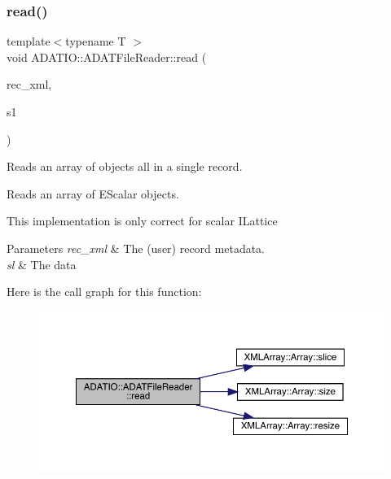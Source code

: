 \subsubsection{\texorpdfstring{read()}{read()}\hspace{0.1cm}{\footnotesize\ttfamily [2/7]}}
{\footnotesize\ttfamily template$<$typename T $>$ \\
void A\+D\+A\+T\+I\+O\+::\+A\+D\+A\+T\+File\+Reader\+::read (\begin{DoxyParamCaption}\item[{\mbox{\hyperlink{classADATXML_1_1XMLReader}{X\+M\+L\+Reader}} \&}]{rec\+\_\+xml,  }\item[{\mbox{\hyperlink{classXMLArray_1_1Array}{Array}}$<$ \mbox{\hyperlink{classENSEM_1_1EScalar}{E\+Scalar}}$<$ T $>$ $>$ \&}]{s1 }\end{DoxyParamCaption})}



Reads an array of objects all in a single record. 

Reads an array of E\+Scalar objects.

This implementation is only correct for scalar I\+Lattice


\begin{DoxyParams}{Parameters}
{\em rec\+\_\+xml} & The (user) record metadata. \\
\hline
{\em sl} & The data \\
\hline
\end{DoxyParams}
Here is the call graph for this function\+:
\nopagebreak
\begin{figure}[H]
\begin{center}
\leavevmode
\includegraphics[width=350pt]{db/de5/group__qio_ga32969d6bfdfe9da2912e92d1f0871c20_cgraph}
\end{center}
\end{figure}
\mbox{\label{group__qio_ga2179348a566e0224ed2122acfabf8bc9}} 

